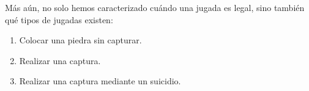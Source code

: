 Más aún, no solo hemos caracterizado cuándo una jugada es legal, sino también qué tipos de jugadas existen:
\begin{enumerate}
	\item Colocar una piedra sin capturar.
	\item Realizar una captura.
	\item Realizar una captura mediante un suicidio.
\end{enumerate}

%		
%		
%		
